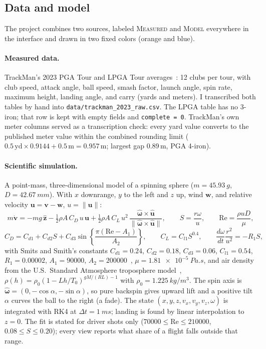 \documentclass[11pt]{article}
\begin{document}
\subsection{Data and model}

The project combines two sources, labeled \textsc{Measured} and \textsc{Model} everywhere in the
interface and drawn in two fixed colors (orange and blue).

\paragraph{Measured data.} TrackMan's 2023 PGA Tour and LPGA Tour averages~\cite{trackman2023}: 12
clubs per tour, with club speed, attack angle, ball speed, smash factor, launch angle, spin rate,
maximum height, landing angle, and carry (yards and meters). I transcribed both tables by hand into
\nolinkurl{data/trackman_2023_raw.csv}. The LPGA table has no 3-iron; that row is kept with empty
fields and \texttt{complete = 0}. TrackMan's own meter columns served as a transcription check: every
yard value converts to the published meter value within the combined rounding limit
($0.5\,\text{yd}\times0.9144+0.5\,\text{m}=0.957$\,m; largest gap 0.89\,m, PGA 4-iron).

\paragraph{Scientific simulation.} A point-mass, three-dimensional model of a spinning sphere
($m=\SI{45.93}{g}$, $D=\SI{42.67}{mm}$). With $x$ downrange, $y$ to the left and $z$ up, wind
$\mathbf w$, and relative velocity $\mathbf u=\mathbf v-\mathbf w$, $u=\lVert\mathbf u\rVert$:
\begin{equation}
m\dot{\mathbf v} = -mg\,\hat{\mathbf z} - \tfrac12\rho A\,C_D\,u\,\mathbf u
 + \tfrac12\rho A\,C_L\,u^2\,\frac{\hat{\boldsymbol\omega}\times\hat{\mathbf u}}{\lVert\hat{\boldsymbol\omega}\times\hat{\mathbf u}\rVert},
\qquad S=\frac{r\omega}{u},\qquad \mathrm{Re}=\frac{\rho u D}{\mu},
\end{equation}
\begin{equation}
C_D = C_{d1}+C_{d2}S+C_{d3}\sin\!\left\{\frac{\pi(\mathrm{Re}-A_1)}{A_2}\right\},\qquad
C_L = C_{l1}S^{0.4},\qquad \frac{d\omega}{dt}\frac{r^2}{u^2}=-R_1S,
\end{equation}
with Smits and Smith's constants $C_{d1}=0.24$, $C_{d2}=0.18$, $C_{d3}=0.06$, $C_{l1}=0.54$,
$R_1=0.00002$, $A_1=\num{90000}$, $A_2=\num{200000}$~\cite{smits1994}, $\mu=\SI{1.81e-5}{Pa.s}$, and air
density from the U.S.\ Standard Atmosphere troposphere model~\cite{ussa1976},
$\rho(h)=\rho_0(1-Lh/T_0)^{gM/(RL)-1}$ with $\rho_0=\SI{1.225}{kg/m^3}$. The spin axis is
$\hat{\boldsymbol\omega}=(0,-\cos\alpha,-\sin\alpha)$, so pure backspin gives upward lift and a
positive tilt $\alpha$ curves the ball to the right (a fade). The state
$(x,y,z,v_x,v_y,v_z,\omega)$ is integrated with RK4 at $\Delta t=\SI{1}{ms}$; landing is found by
linear interpolation to $z=0$. The fit is stated for driver shots only
($\num{70000}\le\mathrm{Re}\le\num{210000}$, $0.08\le S\le0.20$); every view reports what share of a
flight falls outside that range.
\end{document}
